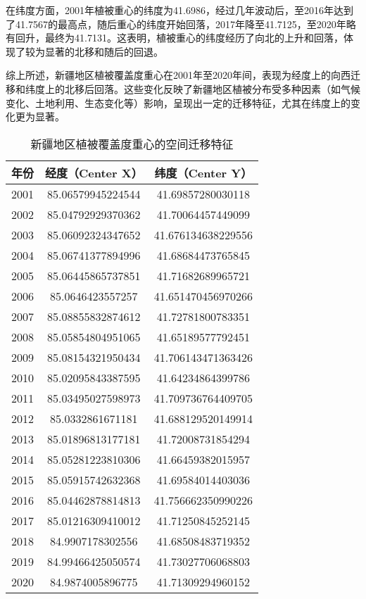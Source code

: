 \documentclass[AutoFakeBold]{LZUThesis-PgD&PhD}
\begin{document}
    在纬度方面，2001年植被重心的纬度为41.6986，经过几年波动后，至2016年达到了41.7567的最高点，随后重心的纬度开始回落，2017年降至41.7125，至2020年略有回升，最终为41.7131。这表明，植被重心的纬度经历了向北的上升和回落，体现了较为显著的北移和随后的回退。
    
    综上所述，新疆地区植被覆盖度重心在2001年至2020年间，表现为经度上的向西迁移和纬度上的北移后回落。这些变化反映了新疆地区植被分布受多种因素（如气候变化、土地利用、生态变化等）影响，呈现出一定的迁移特征，尤其在纬度上的变化更为显著。


	\begin{table}[H]
        \centering
        \begin{tabular}{|c|c|c|}
            \hline
            \textbf{年份} & \textbf{经度（Center X）} & \textbf{纬度（Center Y）} \\
            \hline
            2001 & 85.06579945224544 & 41.69857280030118 \\
            2002 & 85.04792929370362 & 41.70064457449099 \\
            2003 & 85.06092324347652 & 41.676134638229556 \\
            2004 & 85.06741377894996 & 41.68684473765845 \\
            2005 & 85.06445865737851 & 41.71682689965721 \\
            2006 & 85.0646423557257  & 41.651470456970266 \\
            2007 & 85.08855832874612 & 41.72781800783351 \\
            2008 & 85.05854804951065 & 41.65189577792451 \\
            2009 & 85.08154321950434 & 41.706143471363426 \\
            2010 & 85.02095843387595 & 41.64234864399786 \\
            2011 & 85.03495027598973 & 41.709736764409705 \\
            2012 & 85.0332861671181  & 41.688129520149914 \\
            2013 & 85.01896813177181 & 41.72008731854294 \\
            2014 & 85.05281223810306 & 41.66459382015957 \\
            2015 & 85.05915742632368 & 41.69584014403036 \\
            2016 & 85.04462878814813 & 41.756662350990226 \\
            2017 & 85.01216309410012 & 41.71250845252145 \\
            2018 & 84.9907178302556  & 41.68508483719352 \\
            2019 & 84.99466425050574 & 41.73027706068803 \\
            2020 & 84.9874005896775  & 41.71309294960152 \\
            \hline
                \end{tabular}
        \caption{新疆地区植被覆盖度重心的空间迁移特征}
    
            \end{table}
\end{document}
